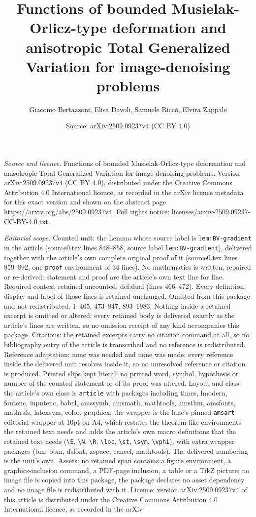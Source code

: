\documentclass[10pt,a4paper]{amsart}
\title[Functions of bounded Musielak-Orlicz-type deformation and an]{Functions of bounded Musielak-Orlicz-type deformation and anisotropic Total Generalized Variation for image-denoising problems}
\author{Giacomo Bertazzoni, Elisa Davoli, Samuele Ricc\`o, Elvira Zappale}
\date{Source: arXiv:2509.09237v4 (CC BY 4.0)}
\begin{document}
\maketitle

\noindent\emph{Source and licence.} Functions of bounded Musielak-Orlicz-type deformation and anisotropic Total Generalized Variation for image-denoising problems. Version arXiv:2509.09237v4 (CC BY 4.0), distributed under the Creative Commons Attribution 4.0 International licence, as recorded in the arXiv licence metadata for this exact version and shown on the abstract page https://arxiv.org/abs/2509.09237v4. Full rights notice: licenses/arxiv-2509.09237-CC-BY-4.0.txt.\par\smallskip

\noindent\textit{Editorial scope.} Counted unit: the Lemma whose source label is \texttt{lem:BV-gradient} in the article (source0.tex lines 848--858, source label \texttt{lem:BV-gradient}), delivered together with the article's own complete original proof of it (source0.tex lines 859--892, one \texttt{proof} environment of 34 lines). No mathematics is written, repaired or re-derived: statement and proof are the article's own text line for line. Required context retained uncounted: def:dual (lines 466--472). Every definition, display and label of those lines is retained unchanged. Omitted from this package and not redistributed: 1--465, 473--847, 893--1983. Nothing inside a retained excerpt is omitted or altered: every retained body is delivered exactly as the article's lines are written, so no omission receipt of any kind accompanies this package. Citations: the retained excerpts carry no citation command at all, so no bibliography entry of the article is transcribed and no reference is redistributed. Reference adaptation: none was needed and none was made; every reference inside the delivered unit resolves inside it, so no unresolved reference or citation is produced. Printed slips kept literal: no printed word, symbol, hypothesis or number of the counted statement or of its proof was altered. Layout and class: the article's own class is \texttt{article} with packages including times, lmodern, fontenc, inputenc, babel, amssymb, amsmath, mathtools, amsthm, amsfonts, mathrsfs, latexsym, color, graphicx; the wrapper is the lane's pinned \texttt{amsart} editorial wrapper at 10pt on A4, which restates the theorem-like environments the retained text needs and adds the article's own macro definitions that the retained text needs (\texttt{\textbackslash E}, \texttt{\textbackslash N}, \texttt{\textbackslash R}, \texttt{\textbackslash loc}, \texttt{\textbackslash st}, \texttt{\textbackslash sym}, \texttt{\textbackslash vphi}), with extra wrapper packages (bm, bbm, dsfont, xspace, cancel, mathtools). The delivered numbering is the unit's own. Assets: no retained span contains a figure environment, a graphics-inclusion command, a PDF-page inclusion, a table or a TikZ picture; no image file is copied into this package, the package declares no asset dependency and no image file is redistributed with it. Licence: version arXiv:2509.09237v4 of this article is distributed under the Creative Commons Attribution 4.0 International licence, as recorded in the arXiv 
\end{document}
